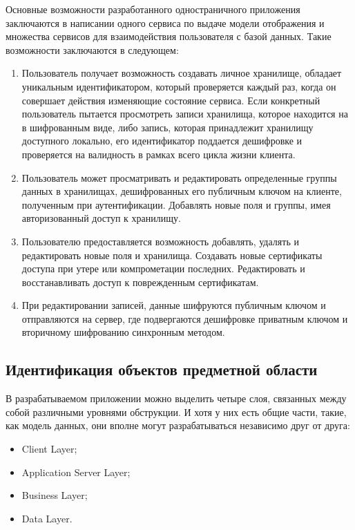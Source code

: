 Основные возможности разработанного одностраничного приложения заключаются в написании одного сервиса по выдаче модели отображения и множества сервисов для взаимодействия пользователя с базой данных. Такие возможности заключаются в следующем:
\begin{enumerate}
  \item Пользователь получает возможность создавать личное хранилище, обладает уникальным идентификатором, который проверяется каждый раз, когда он совершает действия изменяющие состояние сервиса. Если конкретный пользователь пытается просмотреть записи хранилища, которое находится на в шифрованным виде, либо запись, которая принадлежит хранилищу доступного локально, его идентификатор поддается дешифровке и проверяется на валидность в рамках всего цикла жизни клиента.
  \item Пользователь может просматривать и редактировать определенные группы данных в хранилищах, дешифрованных его публичным ключом на клиенте, полученным при аутентификации. Добавлять новые поля и группы, имея авторизованный доступ к хранилищу.
  \item Пользователю предоставляется возможность добавлять, удалять и редактировать новые поля и хранилища. Создавать новые сертификаты доступа при утере или компрометации последних. Редактировать и восстанавливать доступ к поврежденным сертификатам.
  \item При редактировании записей, данные шифруются публичным ключом и отправляются на сервер, где подвергаются дешифровке приватным ключом и вторичному шифрованию синхронным методом.
\end{enumerate}

\subsection{Идентификация объектов предметной области}
\label{sub:domain:object}

В разрабатываемом приложении можно выделить четыре слоя, связанных между собой различными уровнями обструкции. И хотя у них есть общие части, такие, как модель данных, они вполне могут разрабатываться независимо друг от друга:
\begin{itemize}
  \item Client Layer;
  \item Application Server Layer;
  \item Business Layer;
  \item Data Layer.
\end{itemize}

